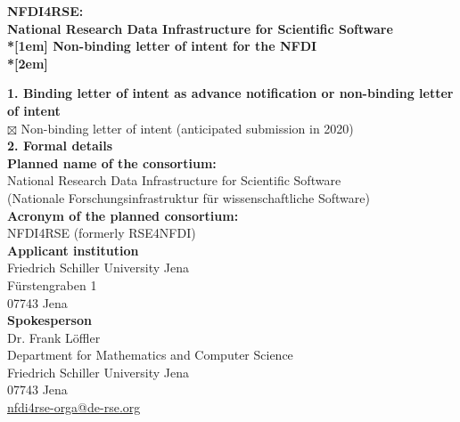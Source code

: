 \documentclass[11pt,a4paper,DIV=11]{scrlttr2}
\begin{document}
\newcommand{\mysec}[1]{\textbf{\hspace{-1cm}#1}\\}


\begin{letter}{}

\begin{centering}
\textbf{\large
NFDI4RSE:\\National Research Data Infrastructure for Scientific Software\\*[1em]
Non-binding letter of intent for the NFDI\\*[2em]
}
\end{centering}

\mysec{1. Binding letter of intent as advance notification or non-binding letter of intent}

$\boxtimes$ Non-binding letter of intent (anticipated submission in 2020)\\

\mysec{2. Formal details}

\textbf{Planned name of the consortium:}\\

National Research Data Infrastructure for Scientific Software\\
(Nationale Forschungsinfrastruktur für wissenschaftliche Software)\\

\textbf{Acronym of the planned consortium:}\\

NFDI4RSE (formerly RSE4NFDI)\\

\textbf{Applicant institution}\\

Friedrich Schiller University Jena\\
Fürstengraben 1\\
07743 Jena\\

\textbf{Spokesperson}\\

Dr. Frank Löffler\\
Department for Mathematics and Computer Science\\
Friedrich Schiller University Jena\\
07743 Jena\\
\href{mailto:nfdi4rse-orga@de-rse.org}{nfdi4rse-orga@de-rse.org}\\


\end{letter}
\end{document}
